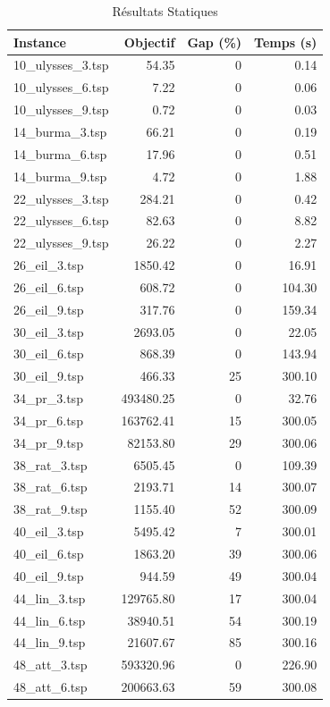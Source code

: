 \begin{table}[H]
\centering
\caption{Résultats Statiques}
\small
\begin{tabular}{|l|r|r|r|}
\hline
\textbf{Instance} & \textbf{Objectif} & \textbf{Gap (\%)} & \textbf{Temps (s)} \\
\hline
10\_ulysses\_3.tsp & 54.35 & 0 & 0.14 \\
10\_ulysses\_6.tsp & 7.22 & 0 & 0.06 \\
10\_ulysses\_9.tsp & 0.72 & 0 & 0.03 \\
14\_burma\_3.tsp & 66.21 & 0 & 0.19 \\
14\_burma\_6.tsp & 17.96 & 0 & 0.51 \\
14\_burma\_9.tsp & 4.72 & 0 & 1.88 \\
22\_ulysses\_3.tsp & 284.21 & 0 & 0.42 \\
22\_ulysses\_6.tsp & 82.63 & 0 & 8.82 \\
22\_ulysses\_9.tsp & 26.22 & 0 & 2.27 \\
26\_eil\_3.tsp & 1850.42 & 0 & 16.91 \\
26\_eil\_6.tsp & 608.72 & 0 & 104.30 \\
26\_eil\_9.tsp & 317.76 & 0 & 159.34 \\
30\_eil\_3.tsp & 2693.05 & 0 & 22.05 \\
30\_eil\_6.tsp & 868.39 & 0 & 143.94 \\
30\_eil\_9.tsp & 466.33 & 25 & 300.10 \\
34\_pr\_3.tsp & 493480.25 & 0 & 32.76 \\
34\_pr\_6.tsp & 163762.41 & 15 & 300.05 \\
34\_pr\_9.tsp & 82153.80 & 29 & 300.06 \\
38\_rat\_3.tsp & 6505.45 & 0 & 109.39 \\
38\_rat\_6.tsp & 2193.71 & 14 & 300.07 \\
38\_rat\_9.tsp & 1155.40 & 52 & 300.09 \\
40\_eil\_3.tsp & 5495.42 & 7 & 300.01 \\
40\_eil\_6.tsp & 1863.20 & 39 & 300.06 \\
40\_eil\_9.tsp & 944.59 & 49 & 300.04 \\
44\_lin\_3.tsp & 129765.80 & 17 & 300.04 \\
44\_lin\_6.tsp & 38940.51 & 54 & 300.19 \\
44\_lin\_9.tsp & 21607.67 & 85 & 300.16 \\
48\_att\_3.tsp & 593320.96 & 0 & 226.90 \\
48\_att\_6.tsp & 200663.63 & 59 & 300.08 \\

\end{tabular}
\end{table}
